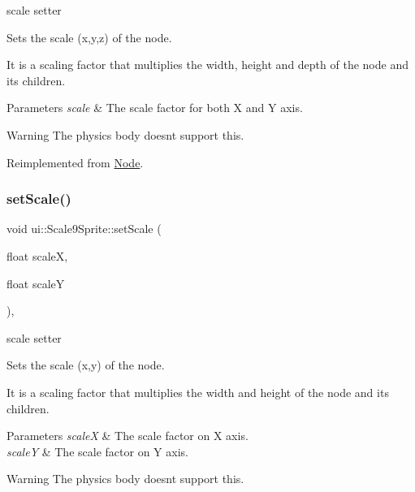 scale setter 

Sets the scale (x,y,z) of the node.

It is a scaling factor that multiplies the width, height and depth of the node and its children.


\begin{DoxyParams}{Parameters}
{\em scale} & The scale factor for both X and Y axis.\\
\hline
\end{DoxyParams}
\begin{DoxyWarning}{Warning}
The physics body doesn\textquotesingle{}t support this. 
\end{DoxyWarning}


Reimplemented from \hyperlink{classNode_acf0955a52f51a9d6c8b0c9267b1e8668}{Node}.

\mbox{\label{classui_1_1Scale9Sprite_a5c98e355992ab8f4e4cfc2f4eac8e104}} 
\subsubsection{\texorpdfstring{set\+Scale()}{setScale()}\hspace{0.1cm}{\footnotesize\ttfamily [2/2]}}
{\footnotesize\ttfamily void ui\+::\+Scale9\+Sprite\+::set\+Scale (\begin{DoxyParamCaption}\item[{float}]{scaleX,  }\item[{float}]{scaleY }\end{DoxyParamCaption})\hspace{0.3cm}{\ttfamily [override]}, {\ttfamily [virtual]}}



scale setter 

Sets the scale (x,y) of the node.

It is a scaling factor that multiplies the width and height of the node and its children.


\begin{DoxyParams}{Parameters}
{\em scaleX} & The scale factor on X axis. \\
\hline
{\em scaleY} & The scale factor on Y axis.\\
\hline
\end{DoxyParams}
\begin{DoxyWarning}{Warning}
The physics body doesn\textquotesingle{}t support this. 
\end{DoxyWarning}


